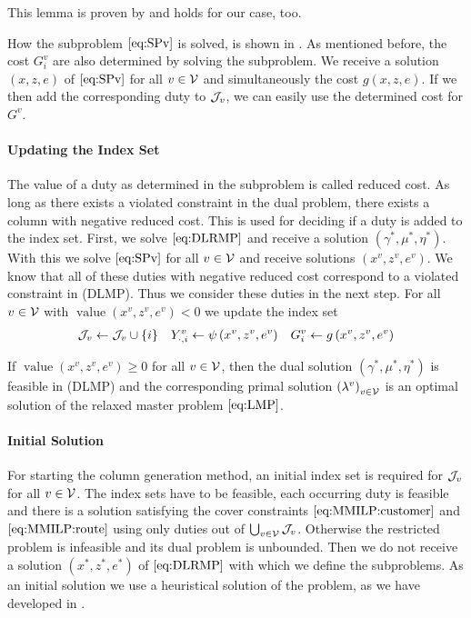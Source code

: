 This lemma is proven by \cite[pp.~42-43]{Kaiser} and holds for our case, too.

How the subproblem $\eqref{eq:SPv}$ is solved, is shown in . As mentioned before, the cost $G^v_i$ are also determined by solving the subproblem. We receive a solution $(x,z,e)$ of $\eqref{eq:SPv}$ for all $v\in\mathcal{V}$ and simultaneously the cost $g(x,z,e)$. If we then add the corresponding duty to $\mathcal{J}_v$, we can easily use the determined cost for $G^v$.

\paragraph{Updating the Index Set} \parfill

The value of a duty as determined in the subproblem is called reduced cost. As long as there exists a violated constraint in the dual problem, there exists a column with negative reduced cost. This is used for deciding if a duty is added to the index set. First, we solve $\eqref{eq:DLRMP}$ and receive a solution $\left(\gamma^*,\mu^*,\eta^*\right)$. With this we solve $\eqref{eq:SPv}$ for all $v\in\mathcal{V}$ and receive solutions $\left(x^v,z^v,e^v\right)$. We know that all of these duties with negative reduced cost correspond to a violated constraint in (DLMP). Thus we consider these duties in the next step. For all $v\in\mathcal{V}$ with $\operatorname{value}\left(x^v,z^v,e^v\right)<0$ we update the index set
\begin{align*}
	\mathcal{J}_v\gets\mathcal{J}_v\cup\{i\} && Y^v_{\cdot,i}\gets\psi\left(x^v,z^v,e^v\right) && G^v_i\gets g\left(x^v,z^v,e^v\right)
\end{align*}

If $\operatorname{value}\left(x^v,z^v,e^v\right)\geq 0$ for all $v\in\mathcal{V}$, then the dual solution $\left(\gamma^*,\mu^*,\eta^*\right)$ is feasible in (DLMP) and the corresponding primal solution $\left(\lambda^v\right)_{v\in\mathcal{V}}$ is an optimal solution of the relaxed master problem $\eqref{eq:LMP}$.

\paragraph{Initial Solution} \parfill

For starting the column generation method, an initial index set is required for $\mathcal{J}_v$ for all $v\in\mathcal{V}$. The index sets have to be feasible, \ie each occurring duty is feasible and there is a solution satisfying the cover constraints $\eqref{eq:MMILP:customer}$ and $\eqref{eq:MMILP:route}$ using only duties out of $\bigcup_{v\in\mathcal{V}}\mathcal{J}_v$. Otherwise the restricted problem is infeasible and its dual problem is unbounded. Then we do not receive a solution $\left(x^*,z^*,e^*\right)$ of $\eqref{eq:DLRMP}$ with which we define the subproblems. As an initial solution we use a heuristical solution of the problem, as we have developed in .

